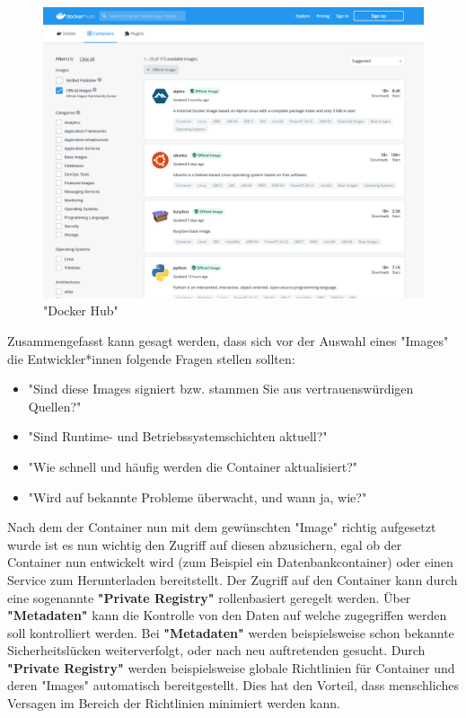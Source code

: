 \begin{figure}[H]
    \centering
    \includegraphics[width=\textwidth]{media/DockerAndContainering/DockerHub.png}
    \caption{"Docker Hub" \cite{DockerHub}}
\end{figure}

Zusammengefasst kann gesagt werden, dass sich vor der Auswahl eines "Images" die Entwickler*innen folgende Fragen stellen sollten:

\begin{itemize}
    \item "Sind diese Images signiert bzw. stammen Sie aus vertrauenswürdigen Quellen?" \cite{ContainerSecurity}
    \item "Sind Runtime- und Betriebssystemschichten aktuell?" \cite{ContainerSecurity}
    \item "Wie schnell und häufig werden die Container aktualisiert?" \cite{ContainerSecurity}
    \item "Wird auf bekannte Probleme überwacht, und wann ja, wie?" \cite{ContainerSecurity}
\end{itemize}


Nach dem der Container nun mit dem gewünschten "Image" richtig aufgesetzt wurde ist es nun wichtig den Zugriff auf diesen abzusichern, egal ob der Container nun entwickelt wird (zum Beispiel ein Datenbankcontainer) oder einen Service zum Herunterladen bereitstellt. Der Zugriff auf den Container kann durch eine sogenannte \textbf{"Private Registry"} rollenbasiert geregelt werden. Über \textbf{"Metadaten"} kann die Kontrolle von den Daten auf welche zugegriffen werden soll kontrolliert werden. Bei \textbf{"Metadaten"} werden beispielsweise schon bekannte Sicherheitslücken weiterverfolgt, oder nach neu auftretenden gesucht. Durch \textbf{"Private Registry"} werden beispielsweise globale Richtlinien für Container und deren "Images" automatisch bereitgestellt. Dies hat den Vorteil, dass menschliches Versagen im Bereich der Richtlinien minimiert werden kann. \cite{ContainerSecurity}

